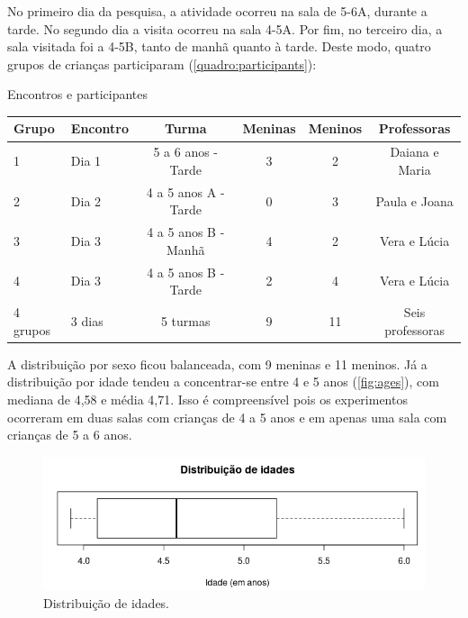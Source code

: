 No primeiro dia da pesquisa, a atividade ocorreu na sala de 5-6A, durante a tarde. No segundo dia a visita ocorreu na sala 4-5A. Por fim, no terceiro dia, a sala visitada foi a 4-5B, tanto de manhã quanto à tarde. Deste modo, quatro grupos de crianças participaram (\autoref{quadro:participants}):

 \begin{quadro}[!h]
 		\setlength{\extrarowheight}{3pt}
        \begin{center}
        \caption{Encontros e participantes}
        \label{quadro:participants}
        \begin{tabular}{@{}llcccc@{}}
            \toprule
            Grupo & Encontro & Turma                    & Meninas & Meninos & Professoras \\ \midrule
            1     & Dia 1    & 5 a 6 anos - Tarde       & 3       & 2       & Daiana e Maria \\
            2     & Dia 2    & 4 a 5 anos A - Tarde     & 0       & 3       & Paula e Joana \\
            3     & Dia 3    & 4 a 5 anos B - Manhã     & 4       & 2       & Vera e Lúcia \\
            4     & Dia 3    & 4 a 5 anos B - Tarde     & 2       & 4       & Vera e Lúcia \\ \midrule
            4 grupos   & 3 dias & 5 turmas              & 9       & 11      & Seis professoras \\ \bottomrule 
            \end{tabular}
        \end{center}
        \sourceauthor
    \end{quadro}

A distribuição por sexo ficou balanceada, com 9 meninas e 11 meninos. Já a distribuição por idade tendeu a concentrar-se entre 4 e 5 anos (\autoref{fig:ages}), com mediana de 4,58 e média 4,71. Isso é compreensível pois os experimentos ocorreram em duas salas com crianças de 4 a 5 anos e em apenas uma sala com crianças de 5 a 6 anos.

\begin{figure}[!htpb]
    \centering
    \includegraphics[width=.6\linewidth,fbox]{figs/ages.png}
    \caption{Distribuição de idades.}
    \sourceauthor
    \label{fig:ages}
\end{figure}

